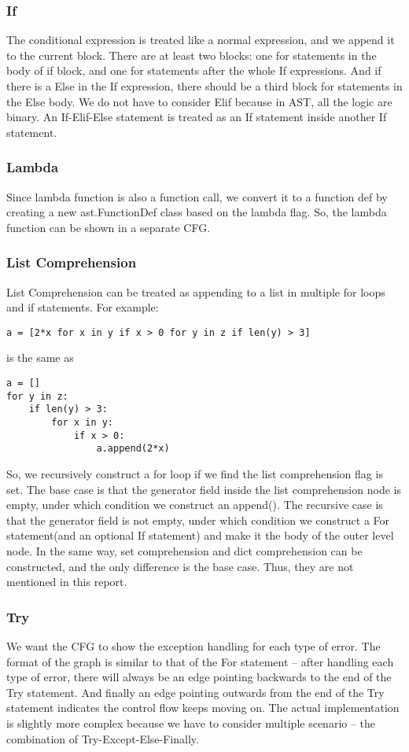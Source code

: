 \documentclass[11pt]{article}
\begin{document}
\subsubsection{If}
The conditional expression is treated like a normal expression, and we append it to the current block. There are at least two blocks: one for statements in the body of if block, and one for statements after the whole If expressions. And if there is a Else in the If expression, there should be a third block for statements in the Else body. We do not have to consider Elif because in AST, all the logic are binary. An If-Elif-Else statement is treated as an If statement inside another If statement.

\subsubsection{Lambda}
Since lambda function is also a function call, we convert it to a function def by creating a new ast.FunctionDef class based on the lambda flag. So, the lambda function can be shown in a separate CFG.

\subsubsection{List Comprehension}
List Comprehension can be treated as appending to a list in multiple for loops and if statements. For example:
\begin{lstlisting}
a = [2*x for x in y if x > 0 for y in z if len(y) > 3]
\end{lstlisting}
is the same as
\begin{lstlisting}
a = []
for y in z:
    if len(y) > 3:
        for x in y:
            if x > 0:
                a.append(2*x)
\end{lstlisting}
So, we recursively construct a for loop if we find the list comprehension flag is set. The base case is that the generator field inside the list comprehension node is empty, under which condition we construct an append(). The recursive case is that the generator field is not empty, under which condition we construct a For statement(and an optional If statement) and make it the body of the outer level node. In the same way, set comprehension and dict comprehension can be constructed, and the only difference is the base case. Thus, they are not mentioned in this report.

\subsubsection{Try}
We want the CFG to show the exception handling for each type of error. The format of the graph is similar to that of the For statement -- after handling each type of error, there will always be an edge pointing backwards to the end of the Try statement. And finally an edge pointing outwards from the end of the Try statement indicates the control flow keeps moving on. The actual implementation is slightly more complex because we have to consider multiple scenario -- the combination of Try-Except-Else-Finally.
\end{document}
